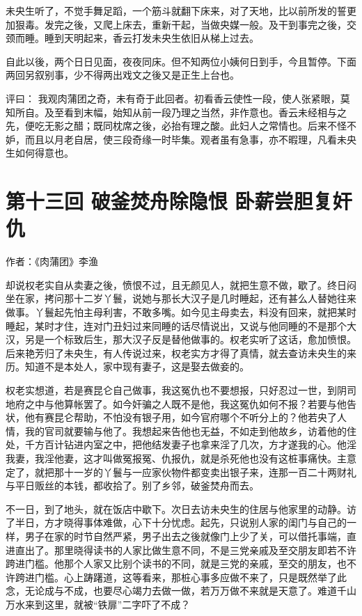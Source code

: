 \documentclass[a4paper,12pt,UTF8,twoside]{ctexbook}
\begin{document}
未央生听了，不觉手舞足蹈，一个筋斗就翻下床来，对了天地，比以前所发的誓更加狠毒。发完之後，又爬上床去，重新干起，当做央媒一般。及干到事完之後，交颈而睡。睡到天明起来，香云打发未央生依旧从梯上过去。

自此以後，两个日日见面，夜夜同床。但不知两位小姨何日到手，今且暂停。下面两回另叙别事，少不得两出戏文之後又是正生上台也。

评曰： 我观肉蒲团之奇，未有奇于此回者。初看香云使性一段，使人张紧眼，莫知所自。及至看到末幅，始知从前一段乃理之当然，非作意也。香云未经相与之先，便吃无影之醋；既同枕席之後，必抬有理之酸。此妇人之常情也。后来不怪不妒，而且以月老自居，使三段奇缘一时毕集。观者虽有急事，亦不暇理，凡看未央生如何得意也。

\chapter{第十三回 破釜焚舟除隐恨 卧薪尝胆复奸仇}

作者：《肉蒲团》李渔

却说权老实自从卖妻之後，愤恨不过，且无颜见人，就把生意不做，歇了。终日闷坐在家，拷问那十二岁丫鬟，说她与那长大汉子是几时睡起，还有甚么人替她往来做事。丫鬟起先怕主母利害，不敢多嘴。如今见主母卖去，料没有回来，就把某时睡起，某时才住，连对门丑妇过来同睡的话尽情说出，又说与他同睡的不是那个大汉，另是一个标致后生，那大汉子反是替他做事的。权老实听了这话，愈加愤恨。后来艳芳归了未央生，有人传说过来，权老实方才得了真情，就去查访未央生的来历。知道不是本处人，家中现有妻子，这是娶去做妾的。

权老实想道，若是赛昆仑自己做事，我这冤仇也不要想报，只好忍过一世，到阴司地府之中与他算帐罢了。如今奸骗之人既不是他，我这冤仇如何不报？若要与他告状，他有赛昆仑帮助，不怕没有银子用，如今官府哪个不听分上的？他若央了人情，我的官司就要输与他了。我想起来告他也无益，不如走到他故乡，访着他的住处，千方百计钻进内室之中，把他结发妻子也拿来淫了几次，方才遂我的心。他淫我妻，我淫他妻，这才叫做冤报冤、仇报仇，就是杀死他也没有这桩事痛快。主意定了，就把那十一岁的丫鬟与一应家伙物件都变卖出银子来，连那一百二十两财礼与平日贩丝的本钱，都收拾了。别了乡邻，破釜焚舟而去。

不一日，到了地头，就在饭店中歇下。次日去访未央生的住居与他家里的动静。访了半日，方才晓得事体难做，心下十分忧虑。起先，只说别人家的闺门与自己的一样，男子在家的时节自然严紧，男子出去之後就像门上少了关，可以借托事端，直进直出了。那里晓得读书的人家比做生意不同，不是三党亲戚及至交朋友即若不许跨进门槛。他那个人家又比别个读书的不同，就是三党的亲戚，至交的朋友，也不许跨进门槛。心上踌躇道，这等看来，那桩心事多应做不来了，只是既然举了此念，无论成与不成，也要尽心竭力去做一做，若万万做不来就是天意了。难道千山万水来到这里，就被“铁扉”二字吓了不成？
\end{document}
